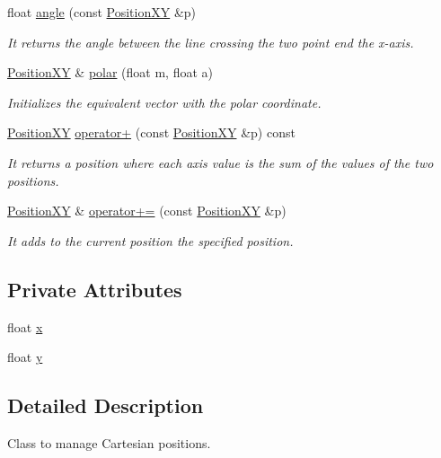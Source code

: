 \begin{DoxyCompactItemize}
float \hyperlink{class_position_x_y_ab3a2559edfce2a9c6eb4ddc6ce456776}{angle} (const \hyperlink{class_position_x_y}{Position\+X\+Y} \&p)
\begin{DoxyCompactList}\small\item\em It returns the angle between the line crossing the two point end the x-\/axis. \end{DoxyCompactList}\item 
\hyperlink{class_position_x_y}{Position\+X\+Y} \& \hyperlink{class_position_x_y_a34f0fb72f96c1307431c317eaba03ce5}{polar} (float m, float a)
\begin{DoxyCompactList}\small\item\em Initializes the equivalent vector with the polar coordinate. \end{DoxyCompactList}\item 
\hyperlink{class_position_x_y}{Position\+X\+Y} \hyperlink{class_position_x_y_a8488dcd6f61a8019e6f3c6d147cf35c5}{operator+} (const \hyperlink{class_position_x_y}{Position\+X\+Y} \&p) const 
\begin{DoxyCompactList}\small\item\em It returns a position where each axis value is the sum of the values of the two positions. \end{DoxyCompactList}\item 
\hyperlink{class_position_x_y}{Position\+X\+Y} \& \hyperlink{class_position_x_y_a3c55c597bad99a80965b24781509e3fd}{operator+=} (const \hyperlink{class_position_x_y}{Position\+X\+Y} \&p)
\begin{DoxyCompactList}\small\item\em It adds to the current position the specified position. \end{DoxyCompactList}\end{DoxyCompactItemize}
\subsection*{Private Attributes}
\begin{DoxyCompactItemize}
\item 
float \hyperlink{class_position_x_y_a99d0a24e481bb0615157a08c1360dcec}{x}
\item 
float \hyperlink{class_position_x_y_a16068e19060b1b47cee29398f2b26249}{y}
\end{DoxyCompactItemize}


\subsection{Detailed Description}
Class to manage Cartesian positions. 

